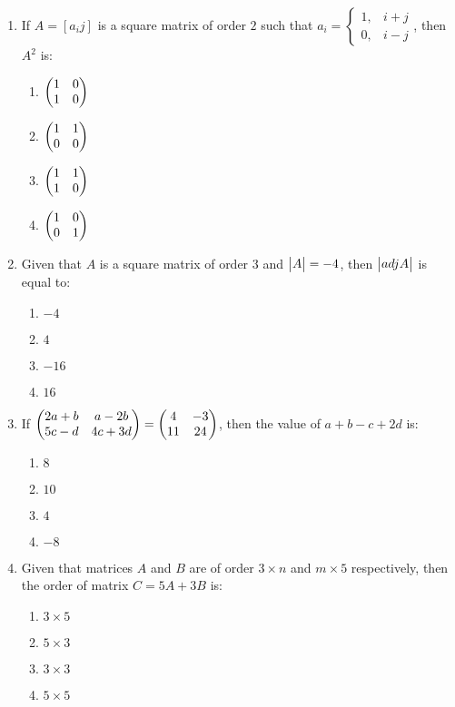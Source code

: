 \documentclass{article}
\begin{document}
\begin{enumerate}
    \item If $A = [a_{i}{j}]$ is a square matrix of order $2$ such that $a_{i} = \begin{cases}1, & i + j \\0, & i-j
    \end{cases}$, then $A^2$ is:
    \begin{enumerate}
        \item $\begin{pmatrix}1 & 0 \\ 1 & 0\end{pmatrix}$
        \item $\begin{pmatrix}1 & 1 \\ 0 & 0\end{pmatrix}$
        \item $\begin{pmatrix}1 & 1 \\ 1 & 0\end{pmatrix}$
        \item $\begin{pmatrix}1 & 0 \\ 0 & 1\end{pmatrix}$
    \end{enumerate}

    \item Given that $A$ is a square matrix of order $3$ and $\begin{vmatrix}A\end{vmatrix} = -4$, then $\begin{vmatrix}adj A\end{vmatrix}$ is equal to:
    \begin{enumerate}
        \item $-4$
        \item $4$
        \item $-16$
        \item $16$
    \end{enumerate}
    
    \item If $\begin{pmatrix}2a+b & a-2b \\ 5c-d & 4c+3d\end{pmatrix} = \begin{pmatrix}4 & -3 \\ 11 & 24\end{pmatrix}$, then the value of $a + b - c + 2d$ is:
    \begin{enumerate}
        \item $8$
        \item $10$
        \item $4$ 
        \item $-8$
    \end{enumerate}

    \item Given that matrices $A$ and $B$ are of order $3 \times n$ and $m \times 5$ respectively, then the order of matrix $C = 5A + 3B$ is:
    \begin{enumerate}
        \item $ 3 \times 5$ 
        \item $ 5 \times 3$ 
        \item $ 3 \times 3$ 
        \item $ 5 \times 5$
    \end{enumerate}


\end{enumerate}
\end{document}
